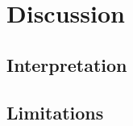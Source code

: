 \chapter{Discussion}\label{ch:discussion}


\section{Interpretation}\label{sec:interpretation}

\section{Limitations}\label{sec:limitations}
